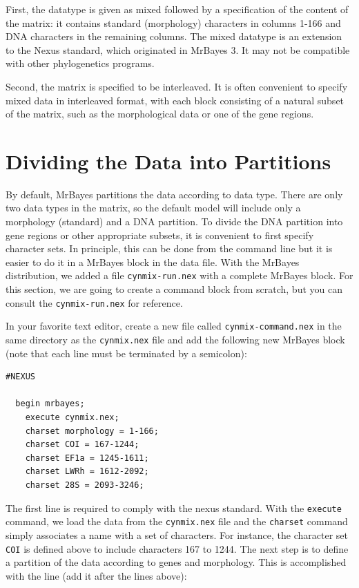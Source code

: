 \documentclass[12pt]{book}
\begin{document}
First, the datatype is given as mixed followed by a specification of the content of the matrix: it contains 
standard (morphology) characters in columns 1-166 and DNA characters in the remaining columns. The mixed 
datatype is an extension to the Nexus standard, which originated in MrBayes 3. It may not be compatible with 
other phylogenetics programs.

Second, the matrix is specified to be interleaved. It is often convenient to specify mixed data in 
interleaved format, with each block consisting of a natural subset of the matrix, such as the morphological 
data or one of the gene regions.

\section{Dividing the Data into Partitions}

By default, MrBayes partitions the data according to data type. There are only two data types in the matrix, 
so the default model will include only a morphology (standard) and a DNA partition. To divide the DNA 
partition into gene regions or other appropriate subsets, it is convenient to first specify character sets. 
In principle, this can be done from the command line but it is easier to do it in a MrBayes block in the 
data file. With the MrBayes distribution, we added a file \texttt{cynmix-run.nex} with a complete MrBayes 
block. For this section, we are going to create a command block from scratch, but you can consult the 
\texttt{cynmix-run.nex} for reference. 

In your favorite text editor, create a new file called \texttt{cynmix-command.nex} in the same directory as 
the \texttt{cynmix.nex} file and add the following new MrBayes block (note that each line must be terminated 
by a semicolon):

\begin{singlespacing}
\small
\begin{verbatim}
#NEXUS
 
  begin mrbayes;
    execute cynmix.nex;
    charset morphology = 1-166;
    charset COI = 167-1244;
    charset EF1a = 1245-1611;
    charset LWRh = 1612-2092;
    charset 28S = 2093-3246;
\end{verbatim}
\normalsize
\end{singlespacing}

The first line is required to comply with the nexus standard. With the \texttt{execute} command, we load the 
data from the \texttt{cynmix.nex} file and the \texttt{charset} command simply associates a name with a set 
of characters. For instance, the character set \texttt{COI} is defined above to include characters 167 to 
1244. The next step is to define a partition of the data according to genes and morphology. This is 
accomplished with the line (add it after the lines above):
\end{document}
